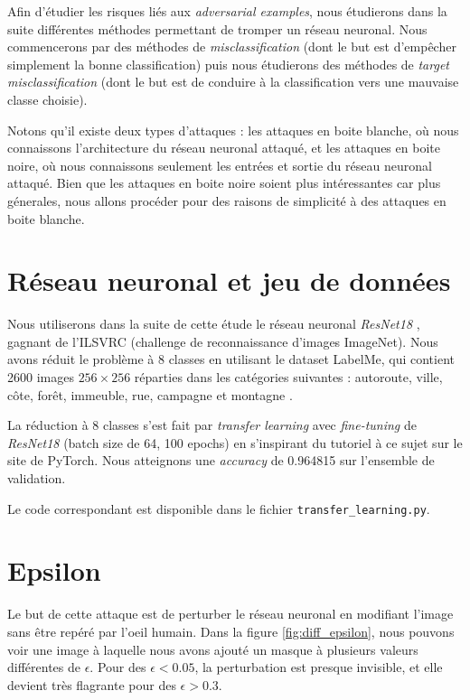 \documentclass[10pt,twocolumn,letterpaper]{article}
\begin{document}
Afin d'étudier les risques liés aux \textit{adversarial examples}, nous étudierons dans la suite différentes méthodes permettant de tromper un réseau neuronal. Nous commencerons par des méthodes de \textit{misclassification} (dont le but est d'empêcher simplement la bonne classification) puis nous étudierons des méthodes de \textit{target misclassification} (dont le but est de conduire à la classification vers une mauvaise classe choisie).

Notons qu'il existe deux types d'attaques : les attaques en boite blanche, où nous connaissons l'architecture du réseau neuronal attaqué, et les attaques en boite noire, où nous connaissons seulement les entrées et sortie du réseau neuronal attaqué. Bien que les attaques en boite noire soient plus intéressantes car plus génerales, nous allons procéder pour des raisons de simplicité à des attaques en boite blanche.

\section{Réseau neuronal et jeu de données}

Nous utiliserons dans la suite de cette étude le réseau neuronal \textit{ResNet18} \cite{he2016residual}, gagnant de l'ILSVRC (challenge de reconnaissance d'images ImageNet). Nous avons réduit le problème à 8 classes en utilisant le dataset LabelMe, qui contient 2600 images $256 \times 256$ réparties dans les catégories suivantes : autoroute, ville, côte, forêt, immeuble, rue, campagne et montagne \cite{oliva2001modeling}.

La réduction à 8 classes s'est fait par \textit{transfer learning} avec \textit{fine-tuning} de \textit{ResNet18} (batch size de 64, 100 epochs) en s'inspirant du tutoriel à ce sujet sur le site de PyTorch. Nous atteignons une \textit{accuracy} de 0.964815 sur l'ensemble de validation.

Le code correspondant est disponible dans le fichier \texttt{transfer\_learning.py}.

\section{Epsilon}
Le but de cette attaque est de perturber le réseau neuronal en modifiant l'image sans être repéré par l'oeil humain. Dans la figure \ref{fig:diff_epsilon}, nous pouvons voir une image à laquelle nous avons ajouté un masque à plusieurs valeurs différentes de $\epsilon$. Pour des $\epsilon < 0.05$, la perturbation est presque invisible, et elle devient très flagrante pour des $\epsilon > 0.3$.
\end{document}
